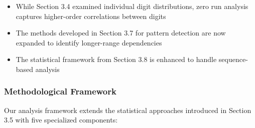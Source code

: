 \begin{itemize}
    \item While Section 3.4 examined individual digit distributions, zero run analysis captures higher-order correlations between digits
    \item The methods developed in Section 3.7 for pattern detection are now expanded to identify longer-range dependencies
    \item The statistical framework from Section 3.8 is enhanced to handle sequence-based analysis
\end{itemize}

\subsubsection{Methodological Framework}
Our analysis framework extends the statistical approaches introduced in Section 3.5 with five specialized components:


